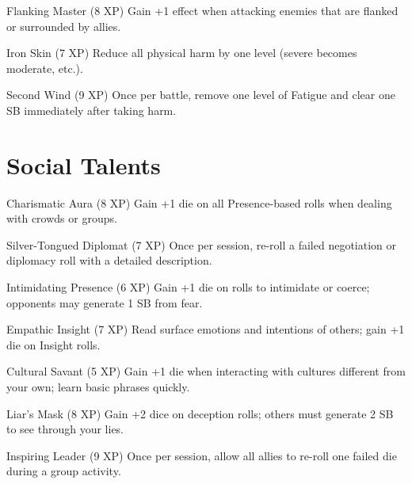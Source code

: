 \documentclass[11pt]{article}
\begin{document}
\begin{talentbox}{Flanking Master (8 XP)}
Gain +1 effect when attacking enemies that are flanked or surrounded by allies.
\end{talentbox}

\begin{talentbox}{Iron Skin (7 XP)}
Reduce all physical harm by one level (severe becomes moderate, etc.).
\end{talentbox}

\begin{talentbox}{Second Wind (9 XP)}
Once per battle, remove one level of Fatigue and clear one SB immediately after taking harm.
\end{talentbox}

\section*{Social Talents}

\begin{talentbox}{Charismatic Aura (8 XP)}
Gain +1 die on all Presence-based rolls when dealing with crowds or groups.
\end{talentbox}

\begin{talentbox}{Silver-Tongued Diplomat (7 XP)}
Once per session, re-roll a failed negotiation or diplomacy roll with a detailed description.
\end{talentbox}

\begin{talentbox}{Intimidating Presence (6 XP)}
Gain +1 die on rolls to intimidate or coerce; opponents may generate 1 SB from fear.
\end{talentbox}

\begin{talentbox}{Empathic Insight (7 XP)}
Read surface emotions and intentions of others; gain +1 die on Insight rolls.
\end{talentbox}

\begin{talentbox}{Cultural Savant (5 XP)}
Gain +1 die when interacting with cultures different from your own; learn basic phrases quickly.
\end{talentbox}

\begin{talentbox}{Liar's Mask (8 XP)}
Gain +2 dice on deception rolls; others must generate 2 SB to see through your lies.
\end{talentbox}

\begin{talentbox}{Inspiring Leader (9 XP)}
Once per session, allow all allies to re-roll one failed die during a group activity.
\end{talentbox}
\end{document}

